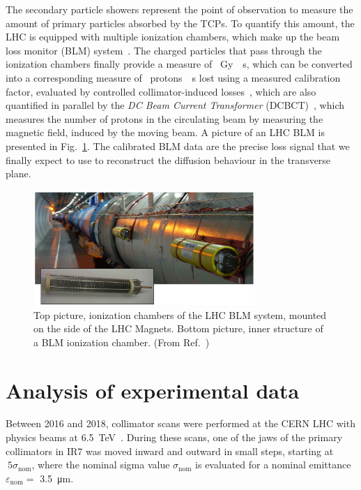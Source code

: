 The secondary particle showers represent the point of observation to measure the amount of primary particles absorbed by the TCPs. To quantify this amount, the LHC is equipped with multiple ionization chambers, which make up the beam loss monitor (BLM) system~\cite{blmSystem1, blmSystem2}. The charged particles that pass through the ionization chambers finally provide a measure of \SI{}{Gy \per s}, which can be converted into a corresponding measure of \SI{}{protons \per s} lost using a measured calibration factor, evaluated by controlled collimator-induced losses~\cite{arek}, which are also quantified in parallel by the \textit{DC Beam Current Transformer} (DCBCT)~\cite{Denard:1213275}, which measures the number of protons in the circulating beam by measuring the magnetic field, induced by the moving beam. A picture of an LHC BLM is presented in Fig.~\ref{fig:blm}. The calibrated BLM data are the precise loss signal that we finally expect to use to reconstruct the diffusion behaviour in the transverse plane.

\begin{figure}[thp]
    \centering
    \includegraphics[width=0.75\textwidth]{5_Diffusion_measurement_LHC/figs/blm.png}
    \caption{Top picture, ionization chambers of the LHC BLM system, mounted on the side of the LHC Magnets. Bottom picture, inner structure of a BLM ionization chamber. (From Ref.~\cite{blmonline})}
    \label{fig:blm}
\end{figure}
%
\section{Analysis of experimental data}\label{sec:4:analysis}
%
Between 2016 and 2018, collimator scans were performed at the CERN LHC with physics beams at \SI{6.5}{TeV}~\cite{PhysRevAccelBeams.23.044802}. During these scans, one of the jaws of the primary collimators in IR7 was moved inward and outward in small steps, starting at $~5\sigma_\text{nom}$, where the nominal sigma value $\sigma_\text{nom}$ is evaluated for a nominal emittance $\varepsilon_\text{nom} =$ \SI{3.5}{\micro\meter}.

